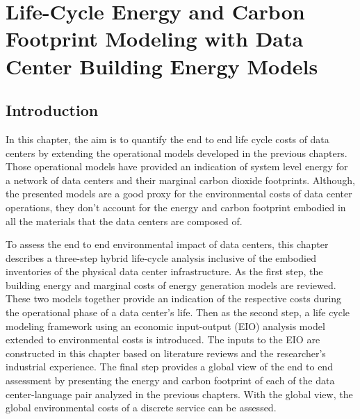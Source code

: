 \chapter{Life-Cycle Energy and Carbon Footprint Modeling with Data Center Building Energy Models}
\label{chp:embodied_cost_model}

\section{Introduction}
    In this chapter, the aim is to quantify the end to end life cycle costs of data centers by extending the operational models developed in the previous chapters. Those operational models have provided an indication of system level energy for a network of data centers and their marginal carbon dioxide footprints. Although, the presented models are a good proxy for the environmental costs of data center operations, they don't account for the energy and carbon footprint embodied in all the materials that the data centers are composed of.

    To assess the end to end environmental impact of data centers, this chapter describes a three-step hybrid life-cycle analysis inclusive of the embodied inventories of the physical data center infrastructure. As the first step, the building energy and marginal costs of energy generation models are reviewed. These two models together provide an indication of the respective costs during the operational phase of a data center's life. Then as the second step, a life cycle modeling framework using an economic input-output (EIO) analysis model extended to environmental costs is introduced. The inputs to the EIO are constructed in this chapter based on literature reviews and the researcher's industrial experience. The final step provides a global view of the end to end assessment by presenting the energy and carbon footprint of each of the data center-language pair analyzed in the previous chapters. With the global view, the global environmental costs of a discrete service can be assessed.

